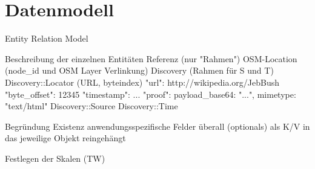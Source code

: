 \section{Datenmodell}

Entity Relation Model

  Beschreibung der einzelnen Entitäten
    Referenz (nur "Rahmen")
    OSM-Location (node\_id und OSM Layer Verlinkung)
    Discovery (Rahmen für S und T)
    Discovery::Locator (URL, byteindex)
        "url": http://wikipedia.org/JebBush
        "byte\_offset": 12345 %
        "timestamp": ...
        "proof": { payload\_base64: "...", mimetype: "text/html" }
    Discovery::Source
    Discovery::Time

    Begründung Existenz anwendungsspezifische Felder überall (optionals) als K/V in das jeweilige Objekt reingehängt

  Festlegen der Skalen (TW)
